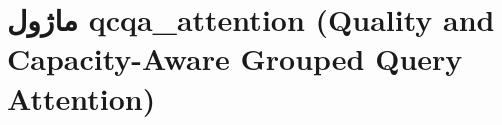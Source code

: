 \section{ماژول qcqa\_attention (Quality and Capacity-Aware Grouped Query Attention)}
\label{sec:module_qcqa_attention}
